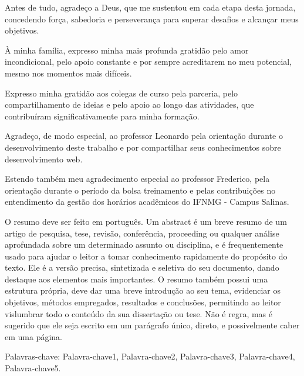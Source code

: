 \documentclass[
	12pt,				%
	twoside,			%
	a4paper,			%
	chapter=TITLE,		%
	section=TITLE,		%
	subsection=TITLE,	%
	subsubsection=TITLE,%
	english,			%
	french,				%
	spanish,			%
	brazil,				%
	]{abntex2}
\date{\normalsize\today} %
\begin{document}
\frenchspacing          %

\pretextual

\imprimircapa                   

\imprimirfolhaderosto

\newpage

\begin{agradecimentos}

Antes de tudo, agradeço a Deus, que me sustentou em cada etapa desta jornada, concedendo força, sabedoria e perseverança para superar desafios e alcançar meus objetivos.

À minha família, expresso minha mais profunda gratidão pelo amor incondicional, pelo apoio constante e por sempre acreditarem no meu potencial, mesmo nos momentos mais difíceis.

Expresso minha gratidão aos colegas de curso pela parceria, pelo compartilhamento de ideias e pelo apoio ao longo das atividades, que contribuíram significativamente para minha formação.

Agradeço, de modo especial, ao professor Leonardo pela orientação durante o desenvolvimento deste trabalho e por compartilhar seus conhecimentos sobre desenvolvimento web.

Estendo também meu agradecimento especial ao professor Frederico, pela orientação durante o período da bolsa treinamento e pelas contribuições no entendimento da gestão dos horários acadêmicos do IFNMG - Campus Salinas.

\end{agradecimentos}

\setlength{\absparsep}{18pt} %

\begin{resumo}
    O resumo deve ser feito em português. 
    Um abstract é um breve resumo de um artigo de pesquisa, tese, revisão, conferência, proceeding ou qualquer análise aprofundada sobre um determinado assunto ou disciplina, e é frequentemente usado para ajudar o leitor a tomar conhecimento rapidamente do propósito do texto.
    Ele é a versão precisa, sintetizada e seletiva do seu documento, dando destaque aos elementos mais importantes. O resumo também possui uma estrutura própria, deve dar uma breve introdução ao seu tema, evidenciar os objetivos, métodos empregados, resultados e conclusões, permitindo ao leitor vislumbrar todo o conteúdo da sua dissertação ou tese. Não é regra, mas é sugerido que ele seja escrito em um parágrafo único, direto, e possivelmente caber em uma página. 
    
        
    Palavras-chave: Palavra-chave1, Palavra-chave2, Palavra-chave3, Palavra-chave4, Palavra-chave5.

\end{resumo}
\end{document}
